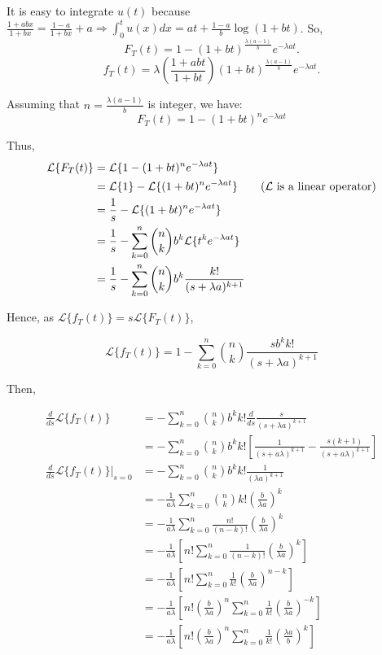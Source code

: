It is easy to integrate $u(t)$ because $\frac{1+abx}{1+bx} = \frac{1-a}{1+bx} + a \Rightarrow \int_0^t u(x) dx = at + \frac{1-a}{b} \log(1+bt)$. So,
$$F_T(t) = 1 - (1+bt)^{\frac{\lambda(a-1)}{b}} e^{-\lambda at}.$$
$$f_T(t) = \lambda \left( \frac{1+abt}{1+bt} \right) (1+bt)^{\frac{\lambda(a-1)}{b}} e^{-\lambda at}.$$

Assuming that $n = \frac{\lambda(a-1)}{b}$ is integer, we have:
$$F_T(t) = 1 - (1+bt)^n e^{-\lambda at}$$

Thus,
\begin{align*}
\mathcal{L}\{F_T(t)\} &= \mathcal{L}\{1 - (1+bt)^n e^{-\lambda at}\} \\
	&= \mathcal{L}\{1\} - \mathcal{L}\{(1+bt)^n e^{-\lambda at}\} \tag{$\mathcal{L}$ is a linear operator} \\
	&= \frac{1}{s} - \mathcal{L}\{(1+bt)^n e^{-\lambda at}\} \\
	&= \frac{1}{s} - \sum_{k=0}^n \binom{n}{k} b^k \mathcal{L}\{t^k e^{-\lambda at}\} \\
	&= \frac{1}{s} - \sum_{k=0}^n \binom{n}{k} b^k \frac{k!}{(s+\lambda a)^{k+1}}
\end{align*}

Hence, as $\mathcal{L}\{f_T(t)\} = s \mathcal{L}\{F_T(t)\}$,

$$\mathcal{L}\{f_T(t)\} = 1 - \sum_{k=0}^n \binom{n}{k} \frac{s b^k k!}{(s+\lambda a)^{k+1}}$$

Then,

\begin{align*}
\frac{d}{ds} \mathcal{L}\{f_T(t)\} 
	&= - \sum_{k=0}^n \binom{n}{k} b^k k! \frac{d}{ds} \frac{s}{(s+\lambda a)^{k+1}} \\
	&= - \sum_{k=0}^n \binom{n}{k} b^k k! \left[ \frac{1}{(s+a\lambda)^{k+1}} - \frac{s(k+1)}{(s+a \lambda)^{k+1}} \right] \\
\frac{d}{ds} \mathcal{L}\{f_T(t)\}|_{s=0} 
	&= - \sum_{k=0}^n \binom{n}{k} b^k k! \frac{1}{(\lambda a)^{k+1}} \\
	&= - \frac{1}{a\lambda} \sum_{k=0}^n \binom{n}{k} k! \left( \frac{b}{\lambda a} \right)^k \\
	&= - \frac{1}{a\lambda} \sum_{k=0}^n \frac{n!}{(n-k)!} \left( \frac{b}{\lambda a} \right)^k \\
	&= - \frac{1}{a\lambda} \left[ n! \sum_{k=0}^n \frac{1}{(n-k)!} \left( \frac{b}{\lambda a} \right)^k \right] \\
	&= - \frac{1}{a\lambda} \left[ n! \sum_{k=0}^n \frac{1}{k!} \left( \frac{b}{\lambda a} \right)^{n-k} \right] \tag{$k \rightarrow n-k$} \\
	&= - \frac{1}{a\lambda} \left[ n! \left(\frac{b}{\lambda a}\right)^n \sum_{k=0}^n \frac{1}{k!} \left( \frac{b}{\lambda a} \right)^{-k} \right] \\
	&= - \frac{1}{a\lambda} \left[ n! \left(\frac{b}{\lambda a}\right)^n \sum_{k=0}^n \frac{1}{k!} \left( \frac{\lambda a}{b} \right)^{k} \right]
\end{align*}

